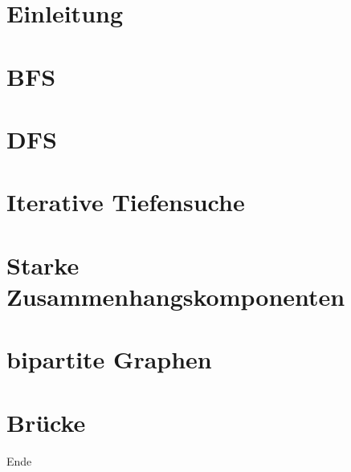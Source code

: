 

\setlength\textheight{7cm} %
	\begin{frame}
		\maketitle
	\end{frame}
	
	\section{Einleitung}
	
	
	\section{BFS}
	
	\section{DFS}
	
	\section{Iterative Tiefensuche}
	
	\section{Starke Zusammenhangskomponenten}
	
	\section{bipartite Graphen}
	
	\section{Brücke}
	
	\begin{frame}
		Ende
	\end{frame}
